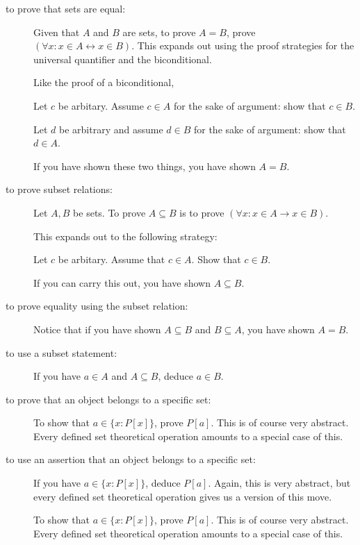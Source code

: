 \documentclass[12pt]{book}
\begin{document}
\begin{description}

\item[to prove that sets are equal:]

Given that $A$ and $B$ are sets, to prove $A=B$, prove $(\forall x:x \in A \leftrightarrow x \in B)$.  This expands out using the proof strategies for the universal quantifier and the biconditional. 

Like the proof of a biconditional, 

Let $c$ be arbitary.  Assume $c \in A$ for the sake of argument:  show that $c \in B$.

Let $d$ be arbitrary and assume $d \in B$ for the sake of argument:  show that $d \in A$.

If you have shown these two things, you have shown $A=B$.

\item[to prove subset relations:]

Let $A,B$ be sets.  To prove $A \subseteq B$ is to prove $(\forall x:x \in A \rightarrow x\in B)$.

This expands out to the following strategy:

Let $c$ be arbitary.  Assume that $c \in A$.  Show that $c \in B$.

If you can carry this out, you have shown $A \subseteq B$.

\item[to prove equality using the subset relation:]

Notice that if you have shown $A \subseteq B$ and $B \subseteq A$, you have shown $A=B$.

\item[to use a subset statement:]  If you have $a \in A$ and $A \subseteq B$, deduce $a \in B$.

\item[to prove that an object belongs to a specific set:]

To show that $a \in \{x:P[x]\}$, prove $P[a]$.  This is of course very abstract.  Every defined set theoretical operation amounts to a special case of this.

\item[to use an assertion that an object belongs to a specific set:]

If you have $a \in \{x:P[x]\}$, deduce $P[a]$.  Again, this is very abstract, but every defined set theoretical operation gives us a version of this move.

To show that $a \in \{x:P[x]\}$, prove $P[a]$.  This is of course very abstract.  Every defined set theoretical operation amounts to a special case of this.


\end{description}
\end{document}
